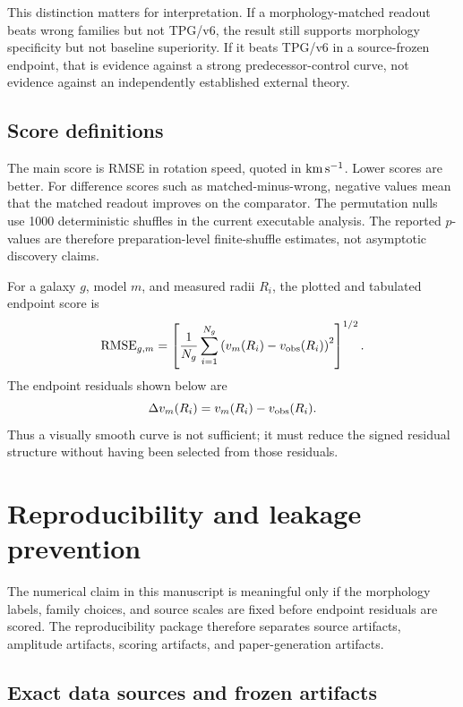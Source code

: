 \documentclass[11pt]{article}
\begin{document}
This distinction matters for interpretation.  If a morphology-matched readout
beats wrong families but not TPG/v6, the result still supports morphology
specificity but not baseline superiority.  If it beats TPG/v6 in a
source-frozen endpoint, that is evidence against a strong predecessor-control
curve, not evidence against an independently established external theory.

\subsection{Score definitions}

The main score is RMSE in rotation speed, quoted in \({\rm km\,s^{-1}}\).
Lower scores are better.  For difference scores such as matched-minus-wrong,
negative values mean that the matched readout improves on the comparator.  The
permutation nulls use 1000 deterministic shuffles in the current executable analysis.  The
reported \(p\)-values are therefore preparation-level finite-shuffle estimates,
not asymptotic discovery claims.

For a galaxy \(g\), model \(m\), and measured radii \(R_i\), the plotted and
tabulated endpoint score is
\[
{\rm RMSE}_{g,m}
 =
\left[
{1\over N_g}
\sum_{i=1}^{N_g}
\left(v_m(R_i)-v_{\rm obs}(R_i)\right)^2
\right]^{1/2}.
\]
The endpoint residuals shown below are
\[
\Delta v_m(R_i)=v_m(R_i)-v_{\rm obs}(R_i).
\]
Thus a visually smooth curve is not sufficient; it must reduce the signed
residual structure without having been selected from those residuals.

\section{Reproducibility and leakage prevention}
\label{sec:repro-leakage}

The numerical claim in this manuscript is meaningful only if the morphology
labels, family choices, and source scales are fixed before endpoint residuals
are scored.  The reproducibility package therefore separates source artifacts,
amplitude artifacts, scoring artifacts, and paper-generation artifacts.

\subsection{Exact data sources and frozen artifacts}
\end{document}
